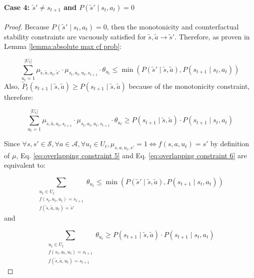\pagebreak
\paragraph{Case 4: $\tilde{s}' \neq s_{t+1}$ and $P(\tilde{s}' \mid s_t, a_t) =0$}

\begin{proof}
    Because $P(\tilde{s}' \mid s_t, a_t) =0$, then the monotonicity and counterfactual stability constraints are vacuously satisfied for $\tilde{s}, \tilde{a} \rightarrow \tilde{s}'$. Therefore, as proven in Lemma \ref{lemma:absolute max cf prob}:

    \begin{equation}
    \label{eq:overlapping constraint 5}
        \sum_{u_t = 1}^{|U_t|} \mu_{\tilde{s}, \tilde{a}, u_t, \tilde{s}'} \cdot \mu_{s_t, a_t, u_t, s_{t+1}} \cdot \theta_{u_t} \leq \min\left(P(\tilde{s}' \mid \tilde{s}, \tilde{a}), P(s_{t+1} \mid s_t, a_t)\right)
    \end{equation}
        Also, $\tilde{P}_t(s_{t+1} \mid \tilde{s}, \tilde{a}) \geq P(s_{t+1} \mid \tilde{s}, \tilde{a})$ because of the monotonicity constraint, therefore:

        \begin{equation}
        \label{eq:overlapping constraint 6}
            \sum_{u_t = 1}^{|U_t|} \mu_{\tilde{s}, \tilde{a}, u_t, s_{t+1}} \cdot \mu_{s_t, a_t, u_t, s_{t+1}} \cdot \theta_{u_t} \geq P(s_{t+1} \mid \tilde{s}, \tilde{a}) \cdot P(s_{t+1} \mid s_t, a_t)
        \end{equation}

        Since $\forall s,s' \in \mathcal{S}, \forall a \in \mathcal{A}, \forall u_t \in U_t, \mu_{s, a, u_t, s'} = 1 \iff f(s, a, u_t) = s'$ by definition of $\mu$, Eq. \eqref{eq:overlapping constraint 5} and Eq. \eqref{eq:overlapping constraint 6} are equivalent to:

\begin{equation}
\label{eq: overlapping constraint 7}
\sum_{\substack{u_t \in U_t \\f(s_t, a_t, u_t) = s_{t+1} \\ f(\tilde{s}, \tilde{a}, u_t) = \tilde{s}'}} \theta_{u_t} \leq \min\left(P(\tilde{s}' \mid \tilde{s}, \tilde{a}), P(s_{t+1} \mid s_t, a_t)\right)     
\end{equation}
and

\begin{equation}
\label{eq: overlapping constraint 8}
\sum_{\substack{u_t \in U_t \\f(s_t, a_t, u_t) = s_{t+1} \\ f(\tilde{s}, \tilde{a}, u_t) = s_{t+1}}} \theta_{u_t}\geq P(s_{t+1} \mid \tilde{s}, \tilde{a}) \cdot P(s_{t+1} \mid s_t, a_t)     
\end{equation}


\end{proof}
